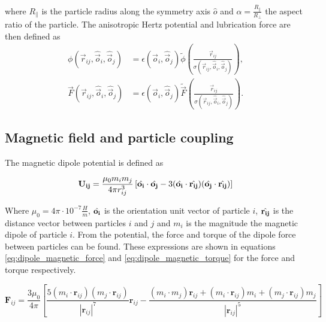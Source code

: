 where $R_{\parallel}$ is the particle radius along the
symmetry axis $\hat{o}$ and $\alpha=\frac{R_{\parallel}}{R_{\perp}}$ the aspect
ratio of the particle. The anisotropic Hertz potential and lubrication
force are then defined as
%
\begin{equation}
    \begin{split}
    \phi\left(\vec{r}_{ij}, \hat{\vec{o}}_i, \hat{\vec{o}}_j\right) &= \epsilon\left(\hat{\vec{o}}_i, \hat{\vec{o}}_j\right) \tilde{\phi}\left(\frac{\vec{r}_{ij}}{\sigma\left(\vec{r}_{ij}, \hat{\vec{o}}_i, \hat{\vec{o}}_j\right)} \right) , \\
    \vec{F}\left(\vec{r}_{ij}, \hat{\vec{o}}_i, \hat{\vec{o}}_j\right) &= \epsilon\left(\hat{\vec{o}}_i, \hat{\vec{o}}_j\right) \tilde{\vec{F}}\left(\frac{\vec{r}_{ij}}{\sigma\left(\vec{r}_{ij}, \hat{\vec{o}}_i, \hat{\vec{o}}_j\right)} \right) .
    \end{split}
\end{equation}

\subsection{Magnetic field and particle coupling}
\label{section:lbm_colloids_magnetics}

The magnetic dipole potential is defined as

\begin{equation}
    \mathbf{U_{ij}} = \frac{\mu_0 m_i m_j}{4\pi r_{ij}^{3}} \left[ \Hat{\mathbf{o_i}} \cdot \Hat{\mathbf{o_j}} - 
    3(\Hat{\mathbf{o_i}} \cdot \Hat{\mathbf{r_{ij}}})(\Hat{\mathbf{o_j}} \cdot \Hat{\mathbf{r_{ij}}}) \right]
    \label{eq:magnet_potential}
\end{equation}

Where $\mu_0 = 4\pi \cdot 10^{-7} \frac{H}{m}$,  $\Hat{\mathbf{o_i}}$ is the orientation unit vector of particle 
$i$, $\Hat{\mathbf{r_{ij}}}$ is the distance vector between particles $i$ and $j$ and $m_i$ is the magnitude the 
magnetic dipole of particle $i$. From the potential, the force and torque of the dipole force between particles 
can be found. These expressions are shown in equations \ref{eq:dipole_magnetic_force} and \ref{eq:dipole_magnetic_torque} 
for the force and torque respectively.

\begin{equation}
    \mathbf{F}_{ij} = \frac{3 \mu_0}{4 \pi} [\frac{5(m_i \cdot \mathbf{r}_{ij})(m_j 
    \cdot \mathbf{r}_{ij})}{|\mathbf{r}_{ij}|^7}\mathbf{r}_{ij} - \frac{(m_i \cdot m_{j})\mathbf{r}_{ij} + 
    (m_i \cdot \mathbf{r}_{ij})m_i + (m_j \cdot \mathbf{r}_{ij})m_j }{|\mathbf{r}_{ij}|^5}]
\label{eq:dipole_magnetic_force}
\end{equation}

